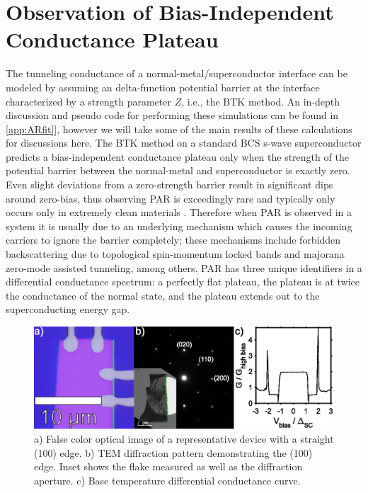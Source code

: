 \section{Observation of Bias-Independent Conductance Plateau}
The tunneling conductance of a normal-metal/superconductor interface can be modeled by assuming an delta-function potential barrier at the interface characterized by a strength parameter $Z$, i.e., the \ac{BTK} method. An in-depth discussion and pseudo code for performing these simulations can be found in \ref{app:ARfit}], however we will take some of the main results of these calculations for discussions here. The \ac{BTK} method on a standard \ac{BCS} s-wave superconductor predicts a bias-independent conductance plateau only when the strength of the potential barrier between the normal-metal and superconductor is exactly zero. Even slight deviations from a zero-strength barrier result in significant dips around zero-bias, thus observing \ac{PAR} is exceedingly rare and typically only occurs only in extremely clean materials . Therefore when \ac{PAR} is observed in a system it is usually due to an underlying mechanism which causes the incoming carriers to ignore the barrier completely; these mechanisms include forbidden backscattering due to topological spin-momentum locked bands and majorana zero-mode assisted tunneling, among others. \ac{PAR} has three unique identifiers in a differential conductance spectrum: a perfectly flat plateau, the plateau is at twice the conductance of the normal state, and the plateau extends out to the superconducting energy gap.\par
\begin{figure}[h]
    \centering
    \includegraphics[width = \textwidth]{Chap4/Figures/DeviceFab.eps}
    \caption{a) False color optical image of a representative device with a straight (100) edge. b) \ac{TEM} diffraction pattern demonstrating the (100) edge. Inset shows the flake measured as well as the diffraction aperture. c) Base temperature differential conductance curve.}
    \label{fig:PARDeviceFab}
\end{figure}
